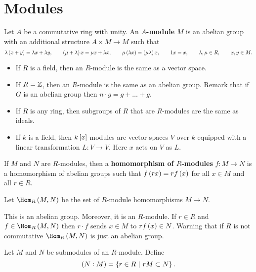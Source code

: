 \section{Modules}

\begin{definition}
Let $ A $ be a commutative ring with unity. An \textbf{$ A $-module} $ M $ is an abelian group with an additional structure $ A \times M \to M $ such that
$$ \lambda\br{x + y} = \lambda x + \lambda y, \qquad \br{\mu + \lambda}x = \mu x + \lambda x, \qquad \mu\br{\lambda x} = \br{\mu\lambda}x, \qquad 1x = x, \qquad \lambda, \mu \in R, \qquad x, y \in M. $$
\end{definition}

\begin{example}
\hfill
\begin{itemize}
\item If $ R $ is a field, then an $ R $-module is the same as a vector space.
\item If $ R = \mathbb{Z} $, then an $ R $-module is the same as an abelian group. Remark that if $ G $ is an abelian group then $ n \cdot g = g + \dots + g $.
\item If $ R $ is any ring, then subgroups of $ R $ that are $ R $-modules are the same as ideals.
\item If $ k $ is a field, then $ k\sbr{x} $-modules are vector spaces $ V $ over $ k $ equipped with a linear transformation $ L : V \to V $. Here $ x $ acts on $ V $ as $ L $.
\end{itemize}
\end{example}

\begin{definition}
If $ M $ and $ N $ are $ R $-modules, then a \textbf{homomorphism of $ R $-modules} $ f : M \to N $ is a homomorphism of abelian groups such that $ f\br{rx} = rf\br{x} $ for all $ x \in M $ and all $ r \in R $.
\end{definition}

\begin{definition}
Let $ \Hom_R\br{M, N} $ be the set of $ R $-module homomorphisms $ M \to N $.
\end{definition}

This is an abelian group. Moreover, it is an $ R $-module. If $ r \in R $ and $ f \in \Hom_R\br{M, N} $ then $ r \cdot f $ sends $ x \in M $ to $ rf\br{x} \in N $. Warning that if $ R $ is not commutative $ \Hom_R\br{M, N} $ is just an abelian group.

\begin{definition}
Let $ M $ and $ N $ be submodules of an $ R $-module. Define
$$ \br{N : M} = \cbr{r \in R \st rM \subset N}. $$
\end{definition}

